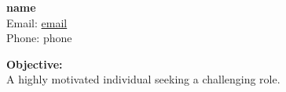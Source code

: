 \documentclass{article}
\begin{document}
\begin{center}
{\Large \textbf{{name}}}\\
Email: \href{mailto:{email}}{email}\\
Phone: {phone}
\end{center}
\vspace{1cm}
\textbf{Objective:}\\
A highly motivated individual seeking a challenging role.
\end{document}

